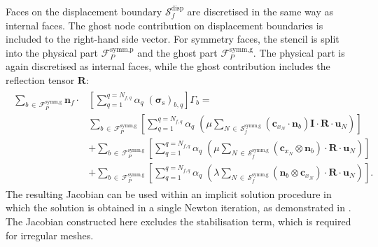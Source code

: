 \documentclass[review,3p]{elsarticle}
\newcommand{\bb}{\boldsymbol}
\begin{document}
%
Faces on the displacement boundary $\mathcal{S}_f^{\text{disp}}$ are discretised in the same way as internal faces.
The ghost node contribution on displacement boundaries is included to the right-hand side vector.
For symmetry faces, the stencil is split into the physical part $\mathcal{F}_P^{\text{symm,p}}$ and the ghost part $\mathcal{F}_P^{\text{symm,g}}$.
The physical part is again discretised as internal faces, while the ghost contribution includes the reflection tensor $\bb{R}$:
%
\begin{eqnarray}
	\begin{split}
		\sum_{b \,\in\, \mathcal{F}_P^{\text{symm,g}}} \bb{n}_{f} \cdot &\left[  \sum_{q=1}^{q=N_{f,q}}\alpha_q \; (\bb{\sigma}_\text{s})_{b,q} \right] \Gamma_b 
		= \\
		& \sum_{b \,\in\, \mathcal{F}_P^{\text{symm,g}}} \left [ \sum_{q=1}^{q=N_{f,q}}\alpha_q \; \left(\mu \sum_{N\,\in\,\mathcal{S}_f^{\text{symm,g}}}(\bb{c}_{x_N}\cdot \bb{n}_b)\bb{I}\cdot \bb{R} \cdot \bb{u}_N  \right) \right] 
		\\
		&  
		+\sum_{b \,\in\, \mathcal{F}_P^{\text{symm,g}}} \left [ \sum_{q=1}^{q=N_{f,q}}\alpha_q \; \left(\mu \sum_{N\,\in\,\mathcal{S}_f^{\text{symm,g}}}(\bb{c}_{x_N} \otimes \bb{n}_b) \cdot \bb{R} \cdot \bb{u}_N  \right) \right] \\
		& 
		+\sum_{b \,\in\, \mathcal{F}_P^{\text{symm,g}}} \left [ \sum_{q=1}^{q=N_{f,q}}\alpha_q \; \left(\lambda \sum_{N\,\in\,\mathcal{S}_f^{\text{symm,g}}}(\bb{n}_b \otimes \bb{c}_{x_N}) \cdot \bb{R} \cdot \bb{u}_N \right) \right] .
	\end{split}
\end{eqnarray}
%
The resulting Jacobian can be used within an implicit solution procedure in which the solution is obtained in a single Newton iteration, as demonstrated in \cite{Castrillo2022}.
The Jacobian constructed here excludes the stabilisation term, which is required for irregular meshes. 
%
%
%
\end{document}

